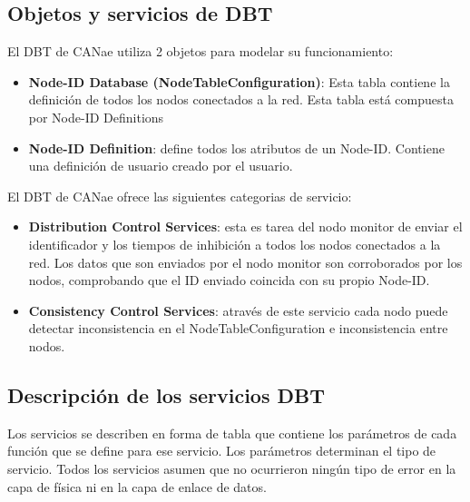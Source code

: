 \subsection{Objetos y servicios de DBT}
El DBT de CANae utiliza 2 objetos para modelar su funcionamiento:
\begin{itemize}
\item \textbf{Node-ID Database (NodeTableConfiguration)}: Esta tabla contiene la
  definición de todos los nodos conectados a la red. Esta tabla está compuesta
  por Node-ID Definitions
\item \textbf{Node-ID Definition}: define todos los atributos de un Node-ID.
  Contiene una definición de usuario creado por el usuario.
\end{itemize}

El DBT de CANae ofrece las siguientes categorias de servicio:
\begin{itemize}
\item \textbf{Distribution Control Services}: esta es tarea del nodo monitor de
  enviar el identificador y los tiempos de inhibición a todos los nodos
  conectados a la red. Los datos que son enviados por el nodo monitor son
  corroborados por los nodos, comprobando que el ID enviado coincida con su
  propio Node-ID.
\item \textbf{Consistency Control Services}: através de este servicio cada nodo
  puede detectar inconsistencia en el NodeTableConfiguration e inconsistencia
  entre nodos.
\end{itemize}

\subsection{Descripción de los servicios DBT}
Los servicios se describen en forma de tabla que contiene los parámetros de
cada función que se define para ese servicio. Los parámetros determinan el tipo
de servicio.  Todos los servicios asumen que no ocurrieron ningún tipo de error
en la capa de física ni en la capa de enlace de datos.

